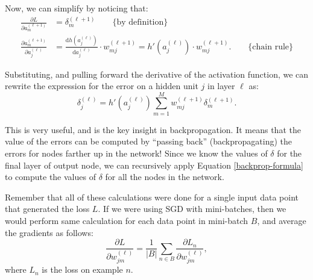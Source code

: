 Now, we can simplify by noticing that:
%
\begin{align}
  \frac{\partial L}{\partial a_m^{(\ell+1)}}&=\delta^{(\ell+1)}_m \quad\quad\mbox{\{by definition\}}\\
  \frac{\partial a_m^{(\ell+1)}}{\partial a_j^{(\ell)}}&=\frac{\mathrm{d}h(a_j^{(\ell)})}{\mathrm{d}a_j^{(\ell)}}\cdot w^{(\ell+1)}_{mj}=h'(a_j^{(\ell)})\cdot w_{mj}^{(\ell+1)}. \quad\quad\mbox{\{chain rule\}}
\end{align}

Substituting, and pulling forward the derivative of the activation function, we can rewrite the expression for the error on a hidden unit $j$ in layer $\ell$ as:
%
\begin{equation} \label{backprop-formula}
	\delta^{(\ell)}_{j} = h'(a^{(\ell)}_{j}) \sum_{m=1}^{M} w^{(\ell+1)}_{mj} \delta^{(\ell+1)}_{m}.
      \end{equation}

      This is very useful, and is the key insight in backpropagation.  It means that the value of the errors  can be computed by ``passing back'' (backpropagating) the errors for  nodes farther up in the network!
%
Since we know the values of $\delta$ for the final layer of output node, we can recursively apply Equation \ref{backprop-formula} to compute the values of $\delta$ for all the nodes in the network.

Remember that all of these calculations were done for a single input data point that generated the loss $L$. If we were using SGD with  mini-batches, then we would perform  same calculation for each data point in mini-batch $B$, and average the gradients as follows:
%
\begin{equation} \label{batch-errors-backprop}
	\frac{\partial L}{\partial w^{(\ell)}_{jm}} = \frac{1}{|B|}\sum_{n\in B} \frac{\partial L_{n}}{\partial w^{(\ell)}_{jm}},
      \end{equation}
      where $L_n$ is the loss on example $n$.
     
